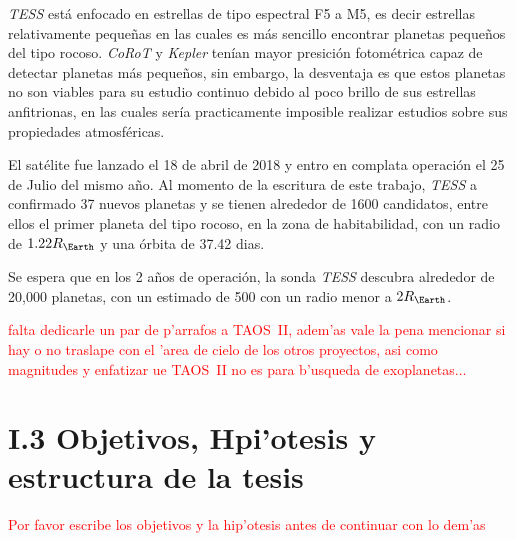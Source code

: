 \textit{TESS} está enfocado en estrellas de tipo espectral F5 a M5, es decir estrellas relativamente pequeñas en las cuales es más sencillo encontrar planetas pequeños del tipo rocoso. \textit{CoRoT} y \textit{Kepler} tenían mayor presición fotométrica capaz de detectar planetas más pequeños, sin embargo, la desventaja es que estos planetas no son viables para su estudio continuo debido al poco brillo de sus estrellas anfitrionas, en las cuales sería practicamente imposible realizar estudios sobre sus propiedades atmosféricas. \cite{sullivan2015transiting} 

El satélite fue lanzado el 18 de abril de 2018 y entro en complata operación el 25 de Julio del mismo año. Al momento de la escritura de este trabajo, \textit{TESS} a confirmado 37 nuevos planetas y se tienen alrededor de 1600 candidatos, entre ellos el primer planeta del tipo rocoso, en la zona de habitabilidad, con un radio de $1.22R_{\Earth}$ y una órbita de 37.42 dias. \cite{gilbert2020first}

Se espera que en los 2 años de operación, la sonda \textit{TESS} descubra alrededor de 20,000 planetas, con un estimado de 500 con un radio menor a $2R_{\Earth}$.


\textcolor{red}{falta dedicarle un par de p'arrafos a TAOS~II, adem'as vale la pena mencionar si hay o no traslape con el 'area de cielo de los otros proyectos, asi como magnitudes y enfatizar ue TAOS~II no es para b'usqueda de exoplanetas... }

\section*{I.3 Objetivos, Hpi'otesis y estructura de la tesis}


\textcolor{red}{Por favor escribe los objetivos y la hip'otesis antes de continuar con lo dem'as}










